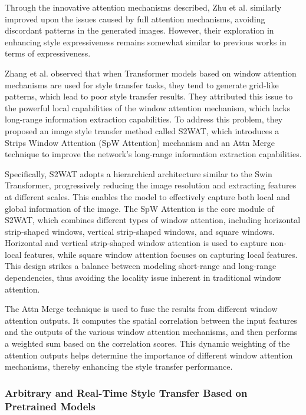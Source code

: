 \documentclass[preprint,12pt]{elsarticle}
\begin{document}
Through the innovative attention mechanisms described, Zhu et al. similarly improved upon the issues caused by full attention mechanisms, avoiding discordant patterns in the generated images. However, their exploration in enhancing style expressiveness\citep{55zhu2023all} remains somewhat similar to previous works in terms of expressiveness.

Zhang et al.\citep{108zhang2024s2wat} observed that when Transformer models based on window attention mechanisms are used for style transfer tasks, they tend to generate grid-like patterns, which lead to poor style transfer results. They attributed this issue to the powerful local capabilities of the window attention mechanism, which lacks long-range information extraction capabilities. To address this problem, they proposed an image style transfer method called S2WAT, which introduces a Strips Window Attention (SpW Attention) mechanism and an Attn Merge technique to improve the network's long-range information extraction capabilities.

Specifically, S2WAT adopts a hierarchical architecture similar to the Swin Transformer, progressively reducing the image resolution and extracting features at different scales. This enables the model to effectively capture both local and global information of the image. The SpW Attention is the core module of S2WAT, which combines different types of window attention, including horizontal strip-shaped windows, vertical strip-shaped windows, and square windows. Horizontal and vertical strip-shaped window attention is used to capture non-local features, while square window attention focuses on capturing local features. This design strikes a balance between modeling short-range and long-range dependencies, thus avoiding the locality issue inherent in traditional window attention.

The Attn Merge technique is used to fuse the results from different window attention outputs. It computes the spatial correlation between the input features and the outputs of the various window attention mechanisms, and then performs a weighted sum based on the correlation scores. This dynamic weighting of the attention outputs helps determine the importance of different window attention mechanisms, thereby enhancing the style transfer performance.

\subsubsection{Arbitrary and Real-Time Style Transfer Based on Pretrained Models}
\end{document}
